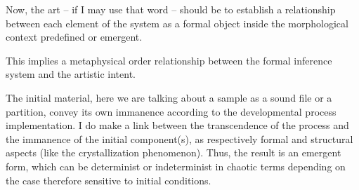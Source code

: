 {Now, the art -- if I may use that word -- should be to establish a relationship between each element of the system as a formal object inside the morphological context predefined or emergent.

This implies a metaphysical order relationship between the formal inference system and the artistic intent.}

{The initial material, here we are talking about a sample as a sound file or a partition, convey its own immanence according to the developmental process implementation. I do make a link between the transcendence of the process and the immanence of the initial component(s), as respectively formal and structural aspects (like the crystallization phenomenon). Thus, the result is an emergent form, which can be determinist or indeterminist in chaotic terms \citep{tdc} depending on the case therefore sensitive to initial conditions.}